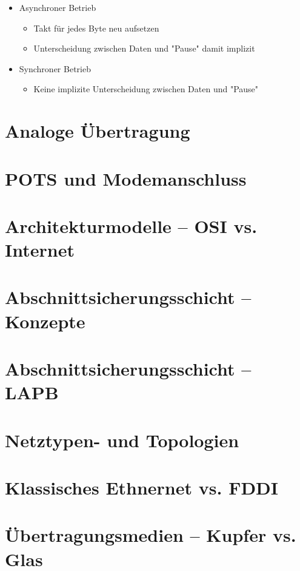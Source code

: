\documentclass[hidelinks]{article}
\begin{document}
\begin{enumerate}
\begin{itemize}
	\item Asynchroner Betrieb
	\begin{itemize}
		\item Takt für jedes Byte neu aufsetzen
		\item Unterscheidung zwischen Daten und "Pause" damit implizit		
	\end{itemize}	
	\newpage
	\item Synchroner Betrieb
	\begin{itemize}
		\item Keine implizite Unterscheidung zwischen Daten und "Pause"
	\end{itemize}
\end{itemize}
\end{enumerate}
\section{Analoge Übertragung}

\section{POTS und Modemanschluss}

\section{Architekturmodelle -- OSI vs. Internet}

\section{Abschnittsicherungsschicht -- Konzepte}

\section{Abschnittsicherungsschicht -- LAPB}

\section{Netztypen- und Topologien}

\section{Klassisches Ethnernet vs. FDDI}

\section{Übertragungsmedien -- Kupfer vs. Glas}
\end{document}
